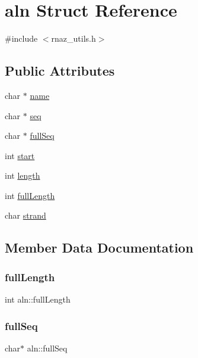 \hypertarget{structaln}{}\section{aln Struct Reference}
\label{structaln}


{\ttfamily \#include $<$rnaz\+\_\+utils.\+h$>$}

\subsection*{Public Attributes}
\begin{DoxyCompactItemize}
\item 
char $\ast$ \hyperlink{structaln_af655f033b20fc2f4361576240cac2c0f}{name}
\item 
char $\ast$ \hyperlink{structaln_aee1fbffa2c18c0b3d6016b8fe409eeae}{seq}
\item 
char $\ast$ \hyperlink{structaln_ad86e38ddd090ff01a1665db42fe80775}{full\+Seq}
\item 
int \hyperlink{structaln_a1cde67bfa55bc9e8f2d98f9e53a4ba12}{start}
\item 
int \hyperlink{structaln_ad03a776f899ce00d63827146906ab6b4}{length}
\item 
int \hyperlink{structaln_a483afd3cef94d6713429e91b3ea2f9a9}{full\+Length}
\item 
char \hyperlink{structaln_aa3a2e698a569a230e9e14e14d3afe653}{strand}
\end{DoxyCompactItemize}


\subsection{Member Data Documentation}
\mbox{\label{structaln_a483afd3cef94d6713429e91b3ea2f9a9}} 
\subsubsection{\texorpdfstring{full\+Length}{fullLength}}
{\footnotesize\ttfamily int aln\+::full\+Length}

\mbox{\label{structaln_ad86e38ddd090ff01a1665db42fe80775}} 
\subsubsection{\texorpdfstring{full\+Seq}{fullSeq}}
{\footnotesize\ttfamily char$\ast$ aln\+::full\+Seq}

